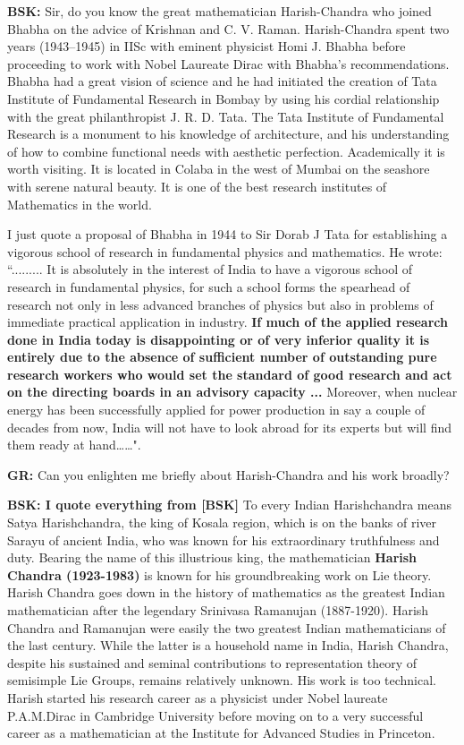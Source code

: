 \textbf{BSK:} Sir, do you know the great mathematician Harish-Chandra who joined Bhabha on the advice of Krishnan and C. V. Raman. Harish-Chandra spent two years (1943--1945) in IISc with eminent physicist Homi J. Bhabha before proceeding to work with Nobel Laureate Dirac with Bhabha’s recommendations.  Bhabha had a great vision of science and he had initiated the creation of Tata Institute of Fundamental Research in Bombay by using his cordial relationship with the great philanthropist J. R. D. Tata.  The Tata Institute of Fundamental Research is a monument to his knowledge of architecture, and his understanding of how to combine functional needs with aesthetic perfection. Academically it is worth visiting. It is located in Colaba in the west of Mumbai on the seashore with serene natural beauty. It is one of the best research institutes of Mathematics in the world.

I just quote a proposal \cite{chap17-key09SM} of Bhabha in 1944 to Sir Dorab J Tata for establishing a vigorous school of research in fundamental physics and mathematics.  He wrote:  ``......... It is absolutely in the interest of India to have a vigorous school of research in fundamental physics, for such a school forms the spearhead of research not only in less advanced branches of physics but also in problems of immediate practical application in industry. \textbf{If much of the applied research done in India today is disappointing or of very inferior quality it is entirely due to the absence of sufficient number of outstanding pure research workers who would set the standard of good research and act on the directing boards in an advisory capacity ...} Moreover, when nuclear energy has been successfully applied for power production in say a couple of decades from now, India will not have to look abroad for its experts but will find them ready at hand……".

\textbf{GR:} Can you enlighten me briefly about Harish-Chandra and his work broadly? 

\textbf{BSK: I quote everything from [BSK]} To every Indian Harishchandra means Satya Harishchandra, the king of Kosala region, which is on the banks of river Sarayu of ancient India, who was known for his extraordinary truthfulness and duty. Bearing the name of this illustrious king, the mathematician \textbf{Harish Chandra (1923-1983)} is known for his groundbreaking work on Lie theory. Harish Chandra goes down in the history of mathematics as the greatest Indian mathematician after the legendary Srinivasa Ramanujan (1887-1920). Harish Chandra and Ramanujan were easily the two greatest Indian mathematicians of the last century. While the latter is a household name in India, Harish Chandra, despite his sustained and seminal contributions to representation theory of semisimple Lie Groups, remains relatively unknown. His work is too technical. Harish started his research career as a physicist under Nobel laureate P.A.M.Dirac in Cambridge University before moving on to a very successful career as a mathematician at the Institute for Advanced Studies in Princeton.

